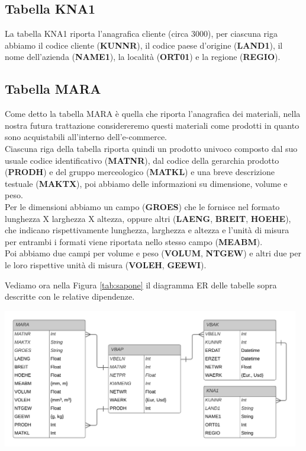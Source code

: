 \subsection{Tabella KNA1}
La tabella KNA1 riporta l'anagrafica cliente (circa 3000), per ciascuna riga abbiamo il codice cliente (\textbf{KUNNR}), il codice paese d'origine (\textbf{LAND1}), il nome dell'azienda (\textbf{NAME1}), la località (\textbf{ORT01}) e la regione (\textbf{REGIO}).

\subsection{Tabella MARA}
Come detto la tabella MARA è quella che riporta l'anagrafica dei materiali, nella nostra futura trattazione considereremo questi materiali come prodotti in quanto sono acquistabili all'interno dell'e-commerce.\\
Ciascuna riga della tabella riporta quindi un prodotto univoco composto dal suo usuale codice identificativo (\textbf{MATNR}), dal codice della gerarchia prodotto (\textbf{PRODH}) e del gruppo merceologico (\textbf{MATKL}) e una breve descrizione testuale (\textbf{MAKTX}), poi abbiamo delle informazioni su dimensione, volume e peso.\\
Per le dimensioni abbiamo un campo (\textbf{GROES}) che le fornisce nel formato lunghezza X larghezza X altezza, oppure altri (\textbf{LAENG}, \textbf{BREIT}, \textbf{HOEHE}), che indicano rispettivamente lunghezza, larghezza e altezza e l'unità di misura per entrambi i formati viene riportata nello stesso campo (\textbf{MEABM}). \\
Poi abbiamo due campi per volume e peso (\textbf{VOLUM}, \textbf{NTGEW}) e altri due per le loro rispettive unità di misura (\textbf{VOLEH}, \textbf{GEEWI}).

Vediamo ora nella Figura \ref{tab:sapone} il diagramma ER delle tabelle sopra descritte con le relative dipendenze.
\begin{center}
	\includegraphics[width=13cm]{figures/ER_sap.png}
	\label{tab:sapone}
\end{center}


